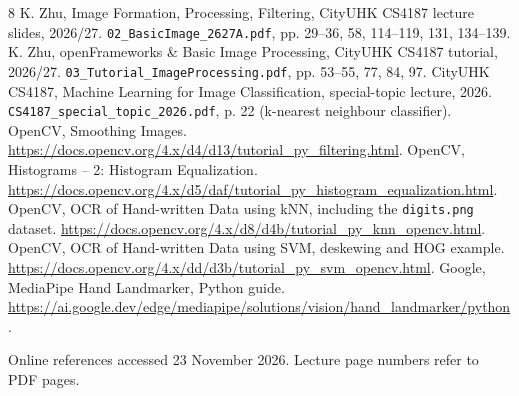 \documentclass[11pt,a4paper]{article}
\newcommand{\code}[1]{\texttt{#1}}
\begin{document}
\begingroup\small\raggedright
\begin{thebibliography}{8}
\setlength{\itemsep}{3pt}
 K. Zhu, \textnormal{Image Formation, Processing, Filtering}, CityUHK CS4187 lecture slides, 2026/27. \code{02\_BasicImage\_2627A.pdf}, pp. 29--36, 58, 114--119, 131, 134--139.
 K. Zhu, \textnormal{openFrameworks \& Basic Image Processing}, CityUHK CS4187 tutorial, 2026/27. \code{03\_Tutorial\_ImageProcessing.pdf}, pp. 53--55, 77, 84, 97.
 CityUHK CS4187, \textnormal{Machine Learning for Image Classification}, special-topic lecture, 2026. \code{CS4187\_special\_topic\_2026.pdf}, p. 22 (k-nearest neighbour classifier).
 OpenCV, \textnormal{Smoothing Images}. \url{https://docs.opencv.org/4.x/d4/d13/tutorial_py_filtering.html}.
 OpenCV, \textnormal{Histograms -- 2: Histogram Equalization}. \url{https://docs.opencv.org/4.x/d5/daf/tutorial_py_histogram_equalization.html}.
 OpenCV, \textnormal{OCR of Hand-written Data using kNN}, including the \code{digits.png} dataset. \url{https://docs.opencv.org/4.x/d8/d4b/tutorial_py_knn_opencv.html}.
 OpenCV, \textnormal{OCR of Hand-written Data using SVM}, deskewing and HOG example. \url{https://docs.opencv.org/4.x/dd/d3b/tutorial_py_svm_opencv.html}.
 Google, \textnormal{MediaPipe Hand Landmarker, Python guide}. \url{https://ai.google.dev/edge/mediapipe/solutions/vision/hand_landmarker/python}.
\end{thebibliography}
Online references accessed 23 November 2026. Lecture page numbers refer to PDF pages.
\endgroup
\end{document}
